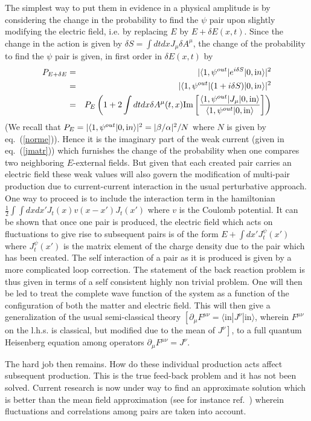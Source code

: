 \documentclass[12pt,oneside]{report}
\def\elematrice#1#2#3{\langle #1|#2|#3 \rangle}
\begin{document}
The simplest way to put them in evidence in a 
physical amplitude is by considering the change in the probability to find
the $\psi$ pair upon slightly modifying the electric field, i.e. by
replacing $E$ by $E+\delta E(x,t)$. Since the change in the action 
is given by $\delta S = \int dt dx J_{\mu} \delta A^{\mu}$, the change of
the probability to find the $\psi$ pair is given, in first order in $
\delta E(x,t)$ by
\begin{eqnarray}
P_{E+\delta E}
&=& \vert \langle 1, \psi^{out} \vert e^{i\delta S} \vert 0, {\mbox in} 
\rangle \vert ^2 \nonumber \\
&=& \vert \langle 1, \psi^{out} \vert ( 1 + i \delta S ) \vert 0, {\mbox in} 
\rangle \vert ^2 \nonumber \\
&=& P_{E} \left( 1 + 2 \int dt dx \delta A^{\mu}(t,x) {\mbox {Im}}
\left[ \frac{\langle 1, \psi^{out} \vert J_{\mu} \vert 0, {\mbox{in}} \rangle}
{\langle 1, \psi^{out} \vert0, {\mbox{in}} \rangle} \right] \right)
\label{PEnew}
\end{eqnarray}
(We recall that $P_{E} = \vert \langle 1, \psi^{out} \vert 0, {\mbox in}
\rangle
\vert ^2= \vert \beta /\alpha \vert ^2 /N$ where $N$ is 
given by eq.~(\ref{norme})). 
Hence it is the imaginary part of the weak current (given in eq.~(\ref{jmatr}))
which furnishes
the change of the probability when one compares two neighboring
$E$-external fields. But given that each created pair carries an electric field
these weak values will also govern the modification of multi-pair
production due to current-current interaction in
the usual
perturbative approach.
One way to proceed is to include the interaction term in the hamiltonian
$\frac 12 \int\int dx dx' J_t(x) v(x-x')J_t(x')$ where $v$ is the Coulomb
potential. 
It can be shown that once one pair is produced, the electric field which acts on
fluctuations to give rise to subsequent pairs is of the form $E+\int dx'
J_t^{\psi}(x')$ where $J_t^{\psi}(x')$ is the  matrix element of the charge
density due to the pair which has been created. The self interaction of a pair
as it is produced is given by a more complicated loop correction.
The statement of the back
reaction problem is thus given in terms of a self consistent highly
non trivial problem.
 One will then be led to treat the complete wave function of the system
as a function of the
configuration of both the matter and electric field. This will then give a
generalization of the
usual semi-classical theory $\left[\partial_{\mu}F^{\mu
\nu}=\elematrice{\mbox{in}}{J^{\nu}}{\mbox{in}}\right.$, wherein $F^{\mu
\nu}$ on the l.h.s.
is classical, but modified due to the mean of $\left. J^{\nu}\right]$, to a
full quantum
Heisenberg equation among operators $\partial_{\mu}F^{\mu
\nu}=J^{\nu}$.
\par The hard job then remains.  How do these individual production
acts affect subsequent production.  This is the true feed-back problem
and it has not been solved.
Current research is now under way to find
an approximate solution
which is better than the mean field 
approximation (see for instance ref.~\cite{CHKMPA}) wherein fluctuations
and correlations among pairs are taken into account.
\end{document}
